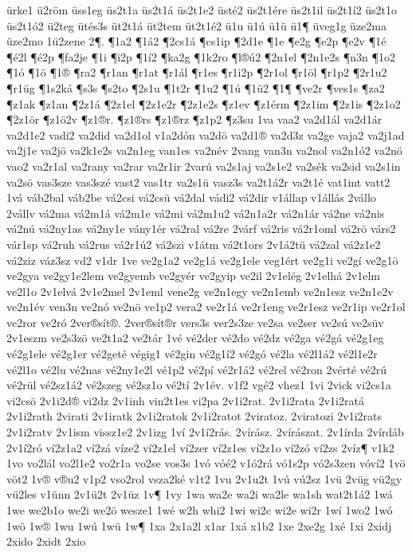 {ürke1
ü2röm
üss1eg
üs2t1a
üs2t1á
üs2t1e2
üsté2
üs2t1ére
üs2t1il
üs2t1í2
üs2t1o
üs2t1ó2
ü2teg
ütés3s
üt2t1á
üt2tem
üt2t1é2
ü1u
ü1ú
ü1ü
ü1¶
üveg1g
üze2ma
üze2mo
1ü2zene
2¶.
¶1a2
¶1á2
¶2cs1á
¶cs1ip
¶2d1e
¶1e
¶e2g
¶e2p
¶e2v
¶1é
¶é2l
¶é2p
¶fa2je
¶1i
¶i2p
¶1í2
¶ka2g
¶1k2ro
¶l®ú2
¶2n1el
¶2n1e2s
¶n3n
¶1o2
¶1ó
¶1ö
¶1®
¶ra2
¶r1an
¶r1at
¶r1ál
¶r1es
¶r1i2p
¶2r1ol
¶r1öl
¶r1p2
¶2r1u2
¶r1üg
¶1s2ká
¶s3s
¶s2to
¶2s1u
¶1t2r
¶1u2
¶1ú
¶1ü2
¶1¶
¶ve2r
¶ves1s
¶za2
¶z1ak
¶z1an
¶2z1á
¶2z1el
¶2z1e2r
¶2z1e2s
¶z1ev
¶z1érm
¶2z1im
¶2z1is
¶2z1o2
¶2z1ör
¶z1ö2v
¶z1®r.
¶z1®rs
¶z1®rz
¶z1p2
¶z3su
1va
vaa2
va2d1ál
va2d1ár
va2d1e2
vadi2
va2did
va2d1ol
v1a2dón
va2dö
va2d1®
va2d3z
va2ge
vaja2
va2j1ad
va2j1e
va2jö
va2k1e2s
va2n1eg
van1es
va2név
2vang
van3n
va2nol
va2n1ó2
va2nö
vao2
va2r1al
va2rany
va2rar
va2r1ir
2varú
va2s1aj
va2s1e2
va2sék
va2sid
va2s1in
va2sö
vas3sze
vas3szé
vast2
vas1tr
va2s1ü
vasz3s
va2t1á2r
va2t1é
vat1int
vatt2
1vá
váb2bal
váb2be
vá2csi
vá2csü
vá2dal
vádi2
vá2dir
v1állap
v1állás
2vállo
2vállv
vá2ma
vá2m1á
vá2m1e
vá2mi
vá2m1u2
vá2n1a2r
vá2n1ár
vá2ne
vá2nis
vá2nú
vá2ny1as
vá2ny1e
vány1ér
vá2ral
vá2re
2várf
vá2ris
vá2r1oml
vá2rö
várs2
vár1sp
vá2ruh
vá2rus
vá2r1ú2
vá2szi
v1átm
vá2t1ors
2v1á2tü
vá2zal
vá2z1e2
vá2ziz
váz3sz
vd2
v1dr
1ve
ve2g1a2
ve2g1á
ve2g1ele
veg1ért
ve2g1i
ve2gí
ve2g1ö
ve2gya
ve2gy1e2lem
ve2gyemb
ve2gyér
ve2gyip
ve2il
2v1elég
2v1elhá
2v1elm
ve2l1o
2v1elvá
2v1e2mel
2v1eml
vene2g
ve2n1egy
ve2n1emb
ve2n1esz
ve2n1e2v
ve2n1év
ven3n
ve2nó
ve2nö
ve1p2
vera2
ve2r1á
ve2r1eng
ve2r1esz
ve2r1ip
ve2r1ol
ve2ror
ve2ró
2ver®sít®.
2ver®sít®r
vers3s
ver2s3ze
ve2sa
ve2ser
ve2sú
ve2süv
2v1eszm
ve2s3zö
ve2t1a2
ve2tár
1vé
vé2der
vé2do
vé2dz
vé2ga
vé2gá
vé2g1eg
vé2g1ele
vé2g1er
vé2geté
végig1
vé2gin
vé2g1í2
vé2gó
vé2la
vé2l1á2
vé2l1e2r
vé2l1o
vé2lu
vé2nas
vé2ny1e2l
vé1p2
vé2pí
vé2r1á2
vé2rel
vé2ron
2vérté
vé2rú
vé2rül
vé2sz1á2
vé2szeg
vé2sz1o
vé2tí
2v1év.
v1f2
vgé2
vhez1
1vi
2vick
vi2cs1a
vi2csö
2v1i2d®
vi2dz
2v1inh
vin2t1es
vi2pa
2v1i2rat.
2v1i2rata
2v1i2ratá
2v1i2rath
2virati
2v1iratk
2v1i2ratok
2v1i2ratot
2viratoz.
2viratozi
2v1i2rats
2v1i2ratv
2v1ism
vissz1e2
2v1izg
1ví
2v1í2rás.
2vírász.
2vírászat.
2v1írda
2vírdáb
2v1í2ró
ví2z1a2
ví2zá
víze2
ví2z1el
ví2zer
ví2z1es
ví2z1o
ví2zó
ví2zs
2víz¶
v1k2
1vo
vo2lál
vo2l1e2
vo2r1a
vo2se
vos3s
1vó
vóé2
v1ó2rá
vó1s2p
vó2s3zen
vóví2
1vö
vöt2
1v®
v®u2
v1p2
vso2rol
vsza2ké
v1t2
1vu
2v1u2t
1vú
vú2sz
1vü
2vüg
vü2gy
vü2les
v1ünn
2v1ü2t
2v1üz
1v¶
1vy
1wa
wa2e
wa2i
wa2le
wa1sh
wat2t1á2
1wá
1we
we2b1o
we2i
we2ö
wesze1
1wé
w2h
whi2
1wi
wi2c
wi2e
wi2r
1wí
1wo2
1wó
1wö
1w®
1wu
1wú
1wü
1w¶
1xa
2x1a2l
x1ar
1xá
x1b2
1xe
2xe2g
1xé
1xi
2xidj
2xido
2xidt
2xio
}
